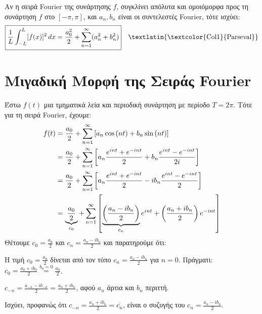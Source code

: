 \documentclass[a4paper,table]{report}
\begin{document}
\begin{prop}
  Αν η σειρά \textlatin{Fourier} της συνάρτησης $ f $, συγκλίνει απόλυτα και 
  ομοιόμορφα προς τη συνάρτηση $ f $ στο $ [- \pi , \pi] $, και $ a_{n}, b_{n} $ είναι 
  οι συντελεστές \textlatin{Fourier}, τότε ισχύει:
  \[
    \boxed{\frac{1}{L} \int _{-L}^{L} [f(x)]^{2} \,{dx} = \frac{a_{0}^{2}}{2} +
    \sum_{n=1}^{\infty} (a_{n}^{2}+b_{n}^{2})} \quad 
    \textlatin{\text{\textcolor{Col1}{Parseval}}} 
  \] 
\end{prop}



\section{Μιγαδική Μορφή της Σειράς \textlatin{Fourier}}


Έστω $f(t)$ μια τμηματικά λεία και περιοδική συνάρτηση με περίοδο $ T=2 \pi $. Τότε 
για τη σειρά \textlatin{Fourier}, έχουμε:
\begin{align}
  \label{eq:fouri}
  f(t) &= \frac{a_{0}}{2} + \sum_{n=1}^{\infty} \left[a_{n} \cos{(nt)} + b_{n} \sin{(nt)}\right] \notag \\
       &= \frac{a_{0}}{2} + \sum_{n=1}^{\infty} \left[a_{n} \frac{e^{int}+e^{-int}}{2} + b_{n} \frac{e^{int}-e^{-int}}{2i} \right] \notag \\
       &= \frac{a_{0}}{2} + \sum_{n=1}^{\infty} \left[a_{n} \frac{e^{int}+e^{-int}}{2} - i b_{n} \frac{e^{int}-e^{-int}}{2}\right] \notag \\
       &= \underbrace{\frac{a_{0}}{2}}_{c_{0}} + \sum_{n=1}^{\infty} \left[\underbrace{\left(\frac{a_{n}-ib_{n}}{2}\right)}_{c_{n}}e^{int} +
       \left(\frac{a_{n}+ib_{n}}{2}\right) e^{-int}\right]
\end{align}
Θέτουμε $ c_{0} = \frac{a_{0}}{2} $ και $ c_{n} = \frac{a_{n}-ib_{n}}{2} $ και
παρατηρούμε ότι:
\begin{myitemize}
  \item Η τιμή $ c_{0} = \frac{a_{0}}{2} $ δίνεται από τον τύπο $ c_{n} =
    \frac{a_{n}- ib_{n}}{2} $ για $ n=0 $. Πράγματι: 
    $ c_{0} = \frac{a_{0}+ib_{0}}{2} \overset{b_{0}=0}{=} \frac{a_{0}}{2}$.
  \item 
    $ c_{-n} = \frac{a_{-n}-ib_{-n}}{2} = \frac{a_{n}+ib_{n}}{2} $, αφού 
    $ a_{n} $ άρτια και $ b_{n} $ περιττή.
  \item Ισχύει, προφανώς ότι $ c_{-n} = \frac{a_{n}+ib_{n}}{2} = \overline{c_{n}}
    $, είναι ο συζυγής του $ c_{n} = \frac{a_{n}-i b_{n}}{2} $.
\end{myitemize}
\end{document}
